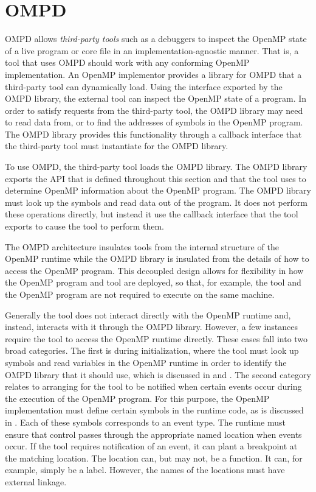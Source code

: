 \section{OMPD}
\label{sec:ompd-overview}
\label{sec:third-party-tool-callback-interface}

OMPD allows \emph{third-party tools} such as a debuggers to inspect the 
OpenMP state of a live program or core file in an implementation-agnostic 
manner. That is, a tool that uses OMPD should work with any conforming 
OpenMP implementation. An OpenMP implementor provides a library for OMPD 
that a third-party tool can dynamically load. Using the interface exported 
by the OMPD library, the external tool can inspect the OpenMP state of a 
program. In order to satisfy requests from the third-party tool, the OMPD 
library may need to read data from, or to find the addresses of symbols in 
the OpenMP program. The OMPD library provides this functionality through a 
callback interface that the third-party tool must instantiate for the OMPD library.

To use OMPD, the third-party tool loads the OMPD library. The OMPD library exports 
the API that is defined throughout this section and that the tool uses to 
determine OpenMP information about the OpenMP program. The OMPD library must
look up the symbols and read data out of the program. It does not perform
these operations directly, but instead it use the callback interface that the
tool exports to cause the tool to perform them.

The OMPD architecture insulates tools from the internal structure of the 
OpenMP runtime while the OMPD library is insulated from the details of how 
to access the OpenMP program. This decoupled design allows for flexibility in how 
the OpenMP program and tool are deployed, so that, for example, the tool and the 
OpenMP program are not required to execute on the same machine.

Generally the tool does not interact directly with the OpenMP runtime and, 
instead, interacts with it through the OMPD library. However, a few instances 
require the tool to access the OpenMP runtime directly. These cases fall into 
two broad categories. The first is during initialization, where the tool must
look up symbols and read variables in the OpenMP runtime in order to identify 
the OMPD library that it should use, which is discussed in 
 and 
. The second category relates to 
arranging for the tool to be notified when certain events occur during the 
execution of the OpenMP program. For this purpose, the OpenMP implementation
must define certain symbols in the runtime code, as is discussed in 
. Each of these symbols corresponds 
to an event type. The runtime must ensure that control passes through the 
appropriate named location when events occur. If the tool requires notification 
of an event, it can plant a breakpoint at the matching location. The location 
can, but may not, be a function. It can, for example, simply be a label. However, 
the names of the locations must have external  linkage.

